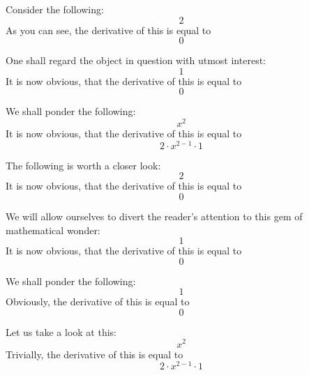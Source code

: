 \documentclass{article}
\begin{document}
Consider the following:
\begin{equation}
2 
\end{equation}
As you can see, the derivative of this is equal to
\begin{equation}
0 
\end{equation}

One shall regard the object in question with utmost interest:
\begin{equation}
1 
\end{equation}
It is now obvious, that the derivative of this is equal to
\begin{equation}
0 
\end{equation}

We shall ponder the following:
\begin{equation}
x ^{2 } 
\end{equation}
It is now obvious, that the derivative of this is equal to
\begin{equation}
2 \cdot x ^{2 - 1 } \cdot 1 
\end{equation}

The following is worth a closer look:
\begin{equation}
2 
\end{equation}
It is now obvious, that the derivative of this is equal to
\begin{equation}
0 
\end{equation}

We will allow ourselves to divert the reader's attention to this gem of mathematical wonder:
\begin{equation}
1 
\end{equation}
It is now obvious, that the derivative of this is equal to
\begin{equation}
0 
\end{equation}

We shall ponder the following:
\begin{equation}
1 
\end{equation}
Obviously, the derivative of this is equal to
\begin{equation}
0 
\end{equation}

Let us take a look at this:
\begin{equation}
x ^{2 } 
\end{equation}
Trivially, the derivative of this is equal to
\begin{equation}
2 \cdot x ^{2 - 1 } \cdot 1 
\end{equation}
\end{document}

